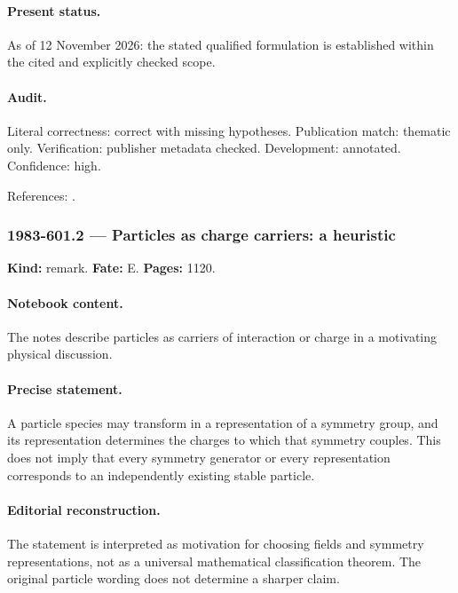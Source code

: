 \paragraph{Present status.} As of 12 November 2026: the stated qualified formulation is established within the cited and explicitly checked scope.

\paragraph{Audit.} Literal correctness: correct with missing hypotheses. Publication match: thematic only. Verification: publisher metadata checked. Development: annotated. Confidence: high.

\noindent References: \citep{witten1983global}.\par

\subsubsection{1983-601.2 --- Particles as charge carriers: a heuristic}

\label{item:1983-601.2}

\noindent\textbf{Kind:} remark. \textbf{Fate:} E. \textbf{Pages:} 1120.\par

\paragraph{Notebook content.} The notes describe particles as carriers of interaction or charge in a motivating physical discussion.

\paragraph{Precise statement.} A particle species may transform in a representation of a symmetry group, and its representation determines the charges to which that symmetry couples. This does not imply that every symmetry generator or every representation corresponds to an independently existing stable particle.

\paragraph{Editorial reconstruction.} The statement is interpreted as motivation for choosing fields and symmetry representations, not as a universal mathematical classification theorem. The original particle wording does not determine a sharper claim.

